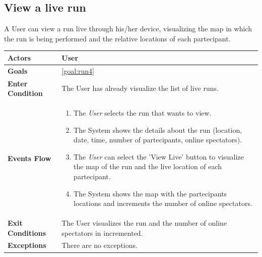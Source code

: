   \subsection{View a live run}
A User can view a run live through his/her device, visualizing the map in which the run is being performed and the relative locations of each partecipant.

\begin{table}[H]
	\centering
    
    \begin{tabular}{|p{3.5cm}|p{10.3cm}|}
    
    \hline
    \textbf{\large{Actors}}  			& \tabitem User 	\\
    				 					
    \hline
    \textbf{\large{Goals}} 				& \ref{goal:run4}\\
    
    \hline
    \textbf{\large{Enter Condition}}	& The User has already visualize the list of live runs.\\
    
    \hline
    \textbf{\large{Events Flow}}		& \begin{enumerate}[leftmargin=0.5cm]
                                          	\item The \emph{User}  selects the run that wants to view.
                                            \item The System shows the details about the run (location, date, time, number of partecipants, online spectators).
                                             \item The \emph{User} can select the 'View Live' button to visualize the map of the run and the live location of each partecipant.
                                            \item The System shows the map with the partecipants locations and increments the number of online spectators.
                                           
                                          \end{enumerate}
    										\\
    \hline
    \textbf{\large{Exit Conditions}}    & The User visualizes the run and the number of online spectators in incremented.  \\
    
    \hline
    \textbf{\large{Exceptions}} 		& There are no exceptions. \\
    
    \hline
    
    
    \end{tabular}
	
\end{table}

